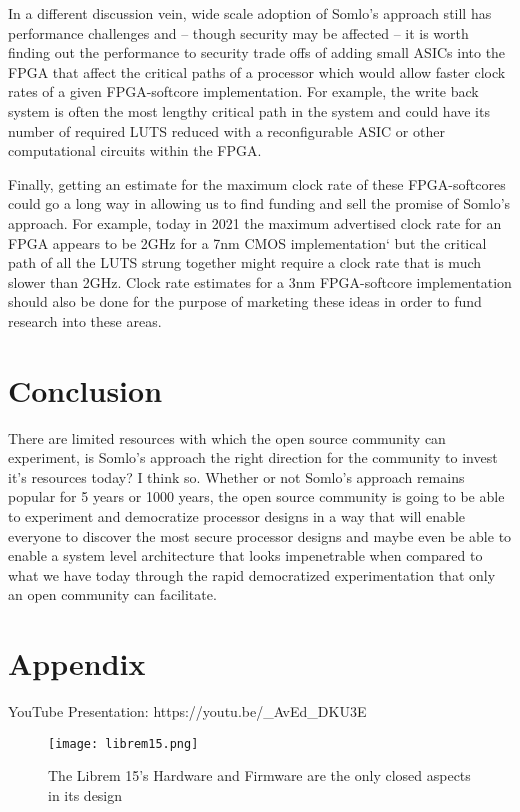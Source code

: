\documentclass[conference]{IEEEtran}
\begin{document}
In a different discussion vein, wide scale adoption of Somlo’s approach still has performance challenges and – though security may be affected – it is worth finding out the performance to security trade offs of adding small ASICs into the FPGA that affect the critical paths of a processor which would allow faster clock rates of a given FPGA-softcore implementation. For example, the write back system is often the most lengthy critical path in the system and could have its number of required LUTS reduced with a reconfigurable ASIC or other computational circuits within the FPGA.

Finally, getting an estimate for the maximum clock rate of these FPGA-softcores could go a long way in allowing us to find funding and sell the promise of Somlo’s approach. For example, today in 2021 the maximum advertised clock rate for an FPGA appears to be 2GHz for a 7nm CMOS implementation`\cite{speedster} but the critical path of all the LUTS strung together might require a clock rate that is much slower than 2GHz. Clock rate estimates for a 3nm FPGA-softcore implementation should also be done for the purpose of marketing these ideas  in order to fund research into these areas.

\section{Conclusion}

There are limited resources with which the open source community can experiment, is Somlo’s approach the right direction for the community to invest it’s resources today? I think so. Whether or not Somlo’s approach remains popular for 5 years or 1000 years, the open source community is going to be able to experiment and democratize processor designs in a way that will enable everyone to discover the most secure processor designs and maybe even be able to enable a system level architecture that looks impenetrable when compared to what we have today through the rapid democratized experimentation that only an open community can facilitate.




\section*{Appendix}

YouTube Presentation:
https://youtu.be/\_AvEd\_DKU3E 

\begin{figure*}
\centering
\texttt{[image: librem15.png]}
\caption{The Librem 15's Hardware and Firmware are the only closed aspects in its design~\cite{bunnie}}
\end{figure*}
\end{document}

